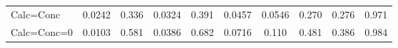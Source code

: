 \begin{tabular}{rrrrrrrrrr}
\multicolumn{1}{l}{Calc=Conc} & \multicolumn{1}{c}{0.0242} & \multicolumn{1}{c}{0.336} & \multicolumn{1}{c}{0.0324} & \multicolumn{1}{c}{0.391} & \multicolumn{1}{c}{0.0457} & \multicolumn{1}{c}{0.0546} & \multicolumn{1}{c}{0.270} & \multicolumn{1}{c}{0.276} & \multicolumn{1}{c}{0.971} \\
\multicolumn{1}{l}{Calc=Conc=0} & \multicolumn{1}{c}{0.0103} & \multicolumn{1}{c}{0.581} & \multicolumn{1}{c}{0.0386} & \multicolumn{1}{c}{0.682} & \multicolumn{1}{c}{0.0716} & \multicolumn{1}{c}{0.110} & \multicolumn{1}{c}{0.481} & \multicolumn{1}{c}{0.386} & \multicolumn{1}{c}{0.984} \\
\bottomrule
\bottomrule
\end{tabular}%
